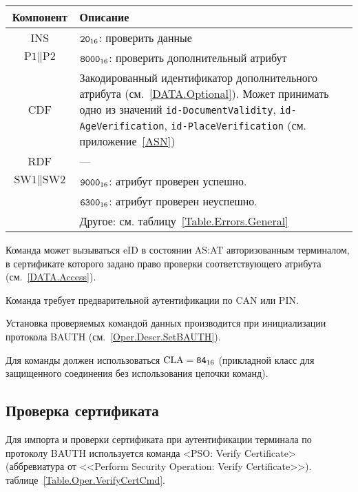 \begin{table}[hbt]
\caption{}\label{Table.Oper.VerifyDataCmd}
\begin{tabular}{|c|p{14cm}|}
\hline
Компонент & Описание \\
\hline
\hline
INS & $\texttt{20}_{16}$: проверить данные\\
\hline
$\text{P1} \parallel \text{P2}$ & $\texttt{8000}_{16}$: 
проверить дополнительный атрибут\\
\hline
CDF & Закодированный идентификатор дополнительного атрибута 
(см.~\ref{DATA.Optional}). 
Может принимать одно из значений 
\verb|id-DocumentValidity|, \verb|id-AgeVerification|, \verb|id-PlaceVerification| 
(см. приложение~\ref{ASN})\\
\hline 
RDF &  --- \\
\hline
$\text{SW1} \parallel \text{SW2}$ & $\texttt{9000}_{16}$: атрибут проверен успешно.\\
 & $\texttt{6300}_{16}$: атрибут проверен неуспешно.\\
 & Другое: см. таблицу~\ref{Table.Errors.General} \\
\hline
\end{tabular}
\end{table}

Команда может вызываться  eID в состоянии AS:AT
авторизованным терминалом, в сертификате которого задано право
проверки соответствующего атрибута (см.~\ref{DATA.Access}).  

Команда требует предварительной аутентификации по CAN или PIN.

Установка проверяемых командой данных производится 
при инициализации протокола BAUTH (см.~\ref{Oper.Descr.SetBAUTH}).  

Для команды должен использоваться $\text{CLA}=\texttt{84}_{16}$ 
(прикладной класс для защищенного соединения без использования цепочки 
команд). 


\subsection{Проверка сертификата}
\label{Oper.Descr.VerifyCert}

Для импорта и проверки сертификата при аутентификации терминала 
по протоколу BAUTH используется команда 
<PSO: Verify Certificate> (аббревиатура от <<Perform Security 
Operation: Verify Certificate>>).
 таблице~\ref{Table.Oper.VerifyCertCmd}.

